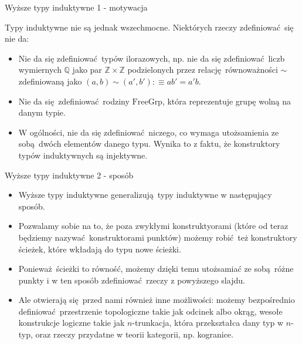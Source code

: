 \documentclass{beamer}
\newcommand{\defn}{:\equiv}
\begin{document}
\begin{frame}{Wyższe typy induktywne 1 - motywacja}

Typy induktywne nie są jednak wszechmocne. Niektórych rzeczy zdefiniować się nie da:
\begin{itemize}
	\item Nie da się zdefiniować typów ilorazowych, np. nie da się zdefiniować liczb wymiernych $\mathbb{Q}$ jako par $\mathbb{Z} \times \mathbb{Z}$ podzielonych przez relację równoważności $\sim$ zdefiniowaną jako $(a, b) \sim (a', b') \defn ab' = a'b$.
	\item Nie da się zdefiniować rodziny $\text{FreeGrp}$, która reprezentuje grupę wolną na danym typie.
	\item W ogólności, nie da się zdefiniować niczego, co wymaga utożsamienia ze sobą dwóch elementów danego typu. Wynika to z faktu, że konstruktory typów induktywnych są injektywne.
\end{itemize}
\end{frame}

\begin{frame}{Wyższe typy induktywne 2 - sposób}
\begin{itemize}
	\item Wyższe typy induktywne generalizują typy induktywne w następujący sposób.
	\item Pozwalamy sobie na to, że poza zwykłymi konstruktyorami (które od teraz będziemy nazywać konstruktorami punktów) możemy robić też konstruktory ścieżek, które wkładają do typu nowe ścieżki.
	\item Ponieważ ścieżki to równość, możemy dzięki temu utożsamiać ze sobą różne punkty i w ten sposób zdefiniować rzeczy z powyższego slajdu.
	\item Ale otwierają się przed nami również inne możliwości: możemy bezpośrednio definiować przestrzenie topologiczne takie jak odcinek albo okrąg, wesołe konstrukcje logiczne takie jak $n$-trunkacja, która przekształca dany typ w $n$-typ, oraz rzeczy przydatne w teorii kategorii, np. kogranice.
\end{itemize}
\end{frame}
\end{document}
